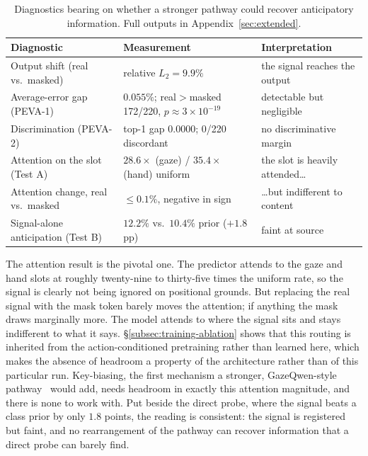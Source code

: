 \begin{table}[t]
  \caption{Diagnostics bearing on whether a stronger pathway could recover
  anticipatory information. Full outputs in Appendix~\ref{sec:extended}.}
  \label{tab:diagnostics}
  \centering
  \small
  \begin{tabular}{lll}
    \toprule
    Diagnostic & Measurement & Interpretation \\
    \midrule
    Output shift (real vs.\ masked)      & relative $L_2 = 9.9\%$
      & the signal reaches the output \\
    Average-error gap (PEVA-1)           & $0.055\%$; real$>$masked 172/220, $p\approx3\times10^{-19}$
      & detectable but negligible \\
    Discrimination (PEVA-2)              & top-1 gap $0.0000$; 0/220 discordant
      & no discriminative margin \\
    Attention on the slot (Test A)       & $28.6\times$ (gaze) / $35.4\times$ (hand) uniform
      & the slot is heavily attended\dots \\
    Attention change, real vs.\ masked   & $\le 0.1\%$, negative in sign
      & \dots but indifferent to content \\
    Signal-alone anticipation (Test B)   & $12.2\%$ vs.\ $10.4\%$ prior ($+1.8$\,pp)
      & faint at source \\
    \bottomrule
  \end{tabular}
\end{table}

The attention result is the pivotal one. The predictor attends to the gaze and
hand slots at roughly twenty-nine to thirty-five times the uniform rate, so the
signal is clearly not being ignored on positional grounds. But replacing the real
signal with the mask token barely moves the attention; if anything the mask draws
marginally more. The model attends to where the signal sits and stays indifferent to what it says.
\S\ref{subsec:training-ablation} shows that this routing is
inherited from the action-conditioned pretraining rather than learned here, which
makes the absence of headroom a property of the architecture rather than of this
particular run. Key-biasing, the first mechanism a stronger, GazeQwen-style
pathway~\citep{pham2026gazeqwen} would add, needs headroom in exactly this
attention magnitude, and there is none to work with. Put beside the direct probe,
where the signal beats a class prior by only $1.8$ points, the reading is
consistent: the signal is registered but faint, and no rearrangement of the
pathway can recover information that a direct probe can barely find.

